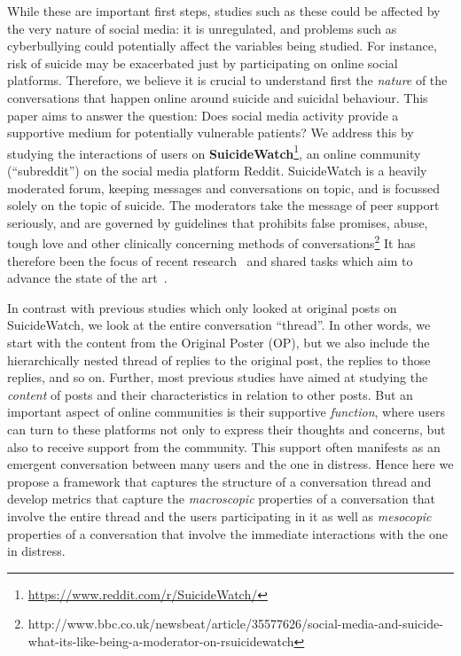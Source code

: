 While these are important first steps, studies such as these could be affected by the very nature of social media: it is unregulated, and problems such as cyberbullying\cite{luxton2012social,patton2014social} could potentially affect the variables being studied.  For instance, risk of suicide may be exacerbated just by participating on online social platforms. Therefore, we believe it is crucial to understand first the \emph{nature} of the conversations that happen online around suicide and suicidal behaviour. This paper aims to answer the question:  Does social media activity provide a supportive medium for potentially vulnerable patients? We address this  by studying the interactions of users on  \textbf{SuicideWatch}\footnote{\url{https://www.reddit.com/r/SuicideWatch/}}, an online community (``subreddit'') on the social media platform Reddit. SuicideWatch is a heavily moderated forum, keeping messages and conversations on topic, and is  focussed solely on the topic of suicide. 
The moderators take the message of peer support seriously, and are governed by guidelines that prohibits false promises, abuse, tough love and other clinically concerning methods of conversations\footnote{http://www.bbc.co.uk/newsbeat/article/35577626/social-media-and-suicide-what-its-like-being-a-moderator-on-rsuicidewatch}
It has therefore been the focus of recent research~\cite{shing2018} and shared tasks which aim to advance the state of the art~\cite{clpsych}. 

In contrast with previous studies which only looked at original posts on SuicideWatch, we look at the entire conversation ``thread''. In other words, we start with the content from the Original Poster (OP), but we also include the hierarchically nested thread of replies to the original post, the replies to those replies, and so on.
%
Further, most previous studies have aimed at studying the \emph{content} of posts and their characteristics in relation to other posts. But an important aspect of online communities is their supportive \emph{function}, where users can turn to these platforms not only to express their thoughts and concerns, but also to receive support from the community. This support often manifests as an emergent conversation between many users and the one in distress. Hence here we propose a framework that captures the structure of a conversation thread and develop metrics that capture the \emph{macroscopic} properties of a conversation that involve the entire thread and the users participating in it as well as \emph{mesocopic} properties of a conversation that involve the immediate interactions with the one in distress. 

